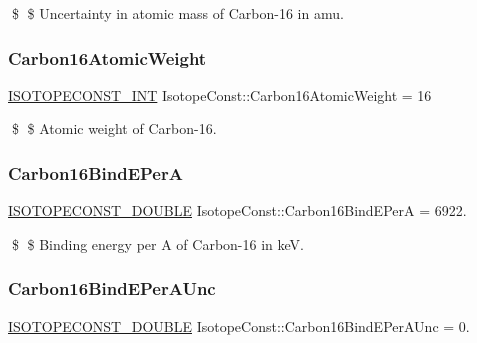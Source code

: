 \$ \$ Uncertainty in atomic mass of Carbon-\/16 in amu. \mbox{\label{group___isotope_const-_carbon-_c16_ga00ceb495d2b19c56786429026aa38787}} 
\subsubsection{\texorpdfstring{Carbon16\+Atomic\+Weight}{Carbon16AtomicWeight}}
{\footnotesize\ttfamily \mbox{\hyperlink{group___isotope_const-_macros_ga5f18360b3e99483a35c32d789e62621c}{I\+S\+O\+T\+O\+P\+E\+C\+O\+N\+S\+T\+\_\+\+I\+NT}} Isotope\+Const\+::\+Carbon16\+Atomic\+Weight = 16}

\$ \$ Atomic weight of Carbon-\/16. \mbox{\label{group___isotope_const-_carbon-_c16_ga607339587ce2fc4cad6e1012ddf254e6}} 
\subsubsection{\texorpdfstring{Carbon16\+Bind\+E\+PerA}{Carbon16BindEPerA}}
{\footnotesize\ttfamily \mbox{\hyperlink{group___isotope_const-_macros_ga8f45a7272ce02c0b4c65c44636ed719a}{I\+S\+O\+T\+O\+P\+E\+C\+O\+N\+S\+T\+\_\+\+D\+O\+U\+B\+LE}} Isotope\+Const\+::\+Carbon16\+Bind\+E\+PerA = 6922.}

\$ \$ Binding energy per A of Carbon-\/16 in keV. \mbox{\label{group___isotope_const-_carbon-_c16_ga8cff1a326986b99c15255c9a28d3b96a}} 
\subsubsection{\texorpdfstring{Carbon16\+Bind\+E\+Per\+A\+Unc}{Carbon16BindEPerAUnc}}
{\footnotesize\ttfamily \mbox{\hyperlink{group___isotope_const-_macros_ga8f45a7272ce02c0b4c65c44636ed719a}{I\+S\+O\+T\+O\+P\+E\+C\+O\+N\+S\+T\+\_\+\+D\+O\+U\+B\+LE}} Isotope\+Const\+::\+Carbon16\+Bind\+E\+Per\+A\+Unc = 0.}

